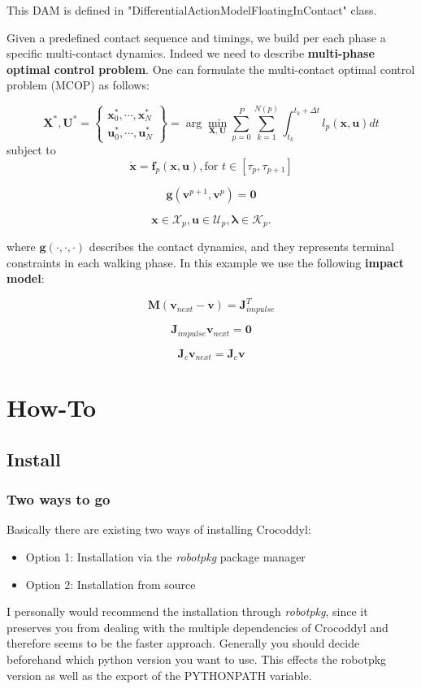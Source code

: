 This DAM is defined in "DifferentialActionModelFloatingInContact" class.

Given a predefined contact sequence and timings, we build per each phase a specific multi-contact dynamics. Indeed we need to describe \textbf{multi-phase optimal control problem}. One can formulate the multi-contact optimal control problem (MCOP) as follows:

$$\mathbf{X}^*,\mathbf{U}^*=
\begin{Bmatrix} \mathbf{x}^*_0,\cdots,\mathbf{x}^*_N \\
				  \mathbf{u}^*_0,\cdots,\mathbf{u}^*_N
\end{Bmatrix} =
\arg\min_{\mathbf{X},\mathbf{U}} \sum_{p=0}^P \sum_{k=1}^{N(p)} \int_{t_k}^{t_k+\Delta t} l_p(\mathbf{x},\mathbf{u})dt$$
subject to
$$ \mathbf{\dot{x}} = \mathbf{f}_p(\mathbf{x},\mathbf{u}), \text{for } t \in [\tau_p,\tau_{p+1}]$$

$$ \mathbf{g}(\mathbf{v}^{p+1},\mathbf{v}^p) = \mathbf{0}$$

$$ \mathbf{x}\in\mathcal{X}_p, \mathbf{u}\in\mathcal{U}_p, \boldsymbol{\lambda}\in\mathcal{K}_p.$$

where $\mathbf{g}(\cdot,\cdot,\cdot)$ describes the contact dynamics, and they represents terminal constraints in each walking phase. In this example we use the following \textbf{impact model}:

$$\mathbf{M}(\mathbf{v}_{next}-\mathbf{v}) = \mathbf{J}_{impulse}^T$$

$$\mathbf{J}_{impulse} \mathbf{v}_{next} = \mathbf{0}$$

$$\mathbf{J}_{c} \mathbf{v}_{next} = \mathbf{J}_{c} \mathbf{v}$$



\section{How-To}
\subsection{Install}
\subsubsection{Two ways to go}
Basically there are existing two ways of installing Crocoddyl: 
\begin{itemize}
\item Option 1: Installation via the \textit{robotpkg } package manager
\item Option 2: Installation from source
\end{itemize} 
I personally would recommend the installation through \textit{robotpkg}, since it preserves you from dealing with the multiple dependencies of Crocoddyl and therefore seems to be the faster approach. Generally you should decide beforehand which python version you want to use. This effects the robotpkg version as well as the export of the PYTHONPATH variable. 

